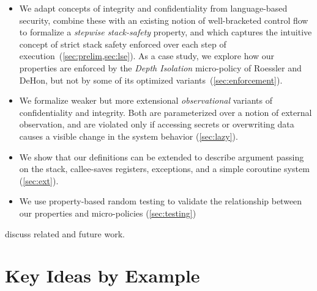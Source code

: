 \documentclass[10pt,conference]{ieeetran}%
\theoremstyle{definition}
\begin{document}
\begin{itemize}
\item We adapt concepts of integrity and confidentiality from language-based
security, combine these with an existing notion of well-bracketed
control flow to formalize a {\em stepwise stack-safety}
property, and which captures the intuitive concept of
strict stack safety enforced over each step of execution~(\cref{sec:prelim,sec:lse}).
As a case study, we explore how our properties are enforced
by the {\em Depth Isolation} micro-policy
of Roessler and DeHon\cite{DBLP:conf/sp/RoesslerD18}, but not by some of its optimized variants~(\cref{sec:enforcement}).
\item We formalize weaker but more extensional \emph{observational} variants of
  confidentiality and integrity. Both are parameterized over a notion of external
  observation, and are violated only if accessing secrets or overwriting
  data causes a visible change in the system behavior (\cref{sec:lazy}).
\item We show that our definitions can be
extended to describe argument passing on the stack, callee-saves registers, exceptions, and a simple coroutine system (\cref{sec:ext}).
\item We use property-based random testing to validate the relationship between
  our properties and micro-policies (\cref{sec:testing})
\end{itemize}
 discuss related and future work.

\section{Key Ideas by Example}
\label{sec:running-example}

\newcommand{\mainsealc}{cyan}
\newcommand{\fsealc}{green}
\newcommand{\unsealc}{lgray}
\newcommand{\emptyoutc}{white} %
\newcommand{\fulloutc}{white}
\newcommand{\badc}{lred}
\newcommand{\goodc}{lblue}
\newcommand{\retptrc}{black}
\newcommand{\sealdesc}[1]{Seal(#1)}
\newcommand{\unsealdesc}{Unseal}
\newcommand{\retptrdesc}{RetPtr}
\newcommand{\passdesc}[2]{Pass(#1,#2)}
\end{document}
